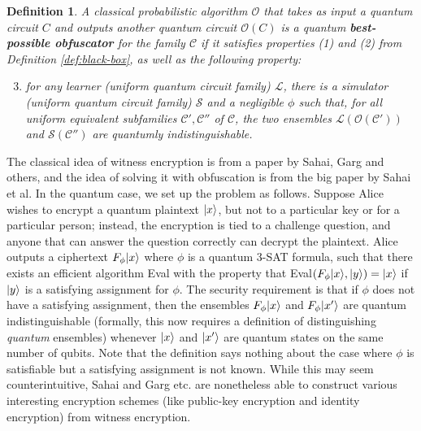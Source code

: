 \documentclass[11pt]{article}
\numberwithin{equation}{section}
\newtheorem{definition}{Definition}
\begin{document}
{\begin{definition} A classical probabilistic algorithm $\mathcal O$ that takes as input a quantum circuit $C$ and outputs another quantum circuit $\mathcal O(C)$ is a quantum {\bf best-possible obfuscator} for the family $\mathcal C$ if it satisfies properties (1) and (2) from Definition \ref{def:black-box}, as well as the following property:
\begin{enumerate}
\setcounter{enumi}{2}
\item for any learner (uniform quantum circuit family) $\mathcal L$, there is a simulator (uniform quantum circuit family) $\mathcal S$ and a negligible $\phi$ such that, for all uniform equivalent subfamilies $\mathcal C', \mathcal C''$ of $\mathcal C$, the two ensembles $\mathcal L(\mathcal O(\mathcal C'))$ and $\mathcal S(\mathcal C'')$ are quantumly indistinguishable.
\end{enumerate}
\end{definition}

 The classical idea of witness encryption is from a paper by Sahai, Garg and others, and the idea of solving it with obfuscation is from the big paper by Sahai et al. In the quantum case, we set up the problem as follows. Suppose Alice wishes to encrypt a quantum plaintext ${\left\vert{x}\right\rangle}$, but not to a particular key or for a particular person; instead, the encryption is tied to a challenge question, and anyone that can answer the question correctly can decrypt the plaintext. Alice outputs a ciphertext $F_\phi {\left\vert{x}\right\rangle}$ where $\phi$ is a quantum 3-SAT formula, such that there exists an efficient algorithm Eval with the property that Eval$(F_\phi{\left\vert{x}\right\rangle}, {\left\vert{y}\right\rangle}) = {\left\vert{x}\right\rangle}$ if ${\left\vert{y}\right\rangle}$ is a satisfying assignment for $\phi$. The security requirement is that if $\phi$ does not have a satisfying assignment, then the ensembles $F_\phi {\left\vert{x}\right\rangle}$ and $F_\phi {\left\vert{x'}\right\rangle}$ are quantum indistinguishable (formally, this now requires a definition of distinguishing \emph{quantum} ensembles) whenever ${\left\vert{x}\right\rangle}$ and ${\left\vert{x'}\right\rangle}$ are quantum states on the same number of qubits. Note that the definition says nothing about the case where $\phi$ is satisfiable but a satisfying assignment is not known. While this may seem counterintuitive, Sahai and Garg etc. are nonetheless able to construct various interesting encryption schemes (like public-key encryption and identity encryption) from witness encryption. 

}
\end{document}
